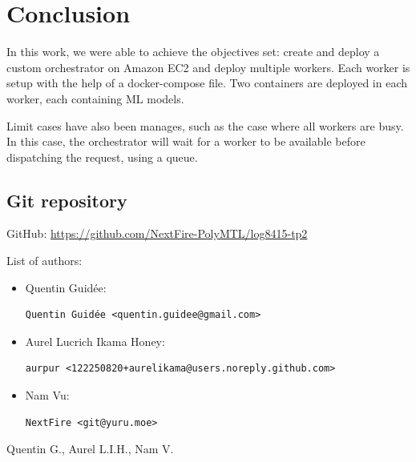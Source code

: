 \documentclass[letterpaper,headings=standardclasses,parskip=half]{scrartcl}
\newcommand{\todo}{{\color{red}{TODO}}}
\begin{document}
\todo

\section{Conclusion}

In this work, we were able to achieve the objectives set: create and deploy a custom orchestrator on Amazon EC2 and deploy multiple workers. Each worker is setup with the help of a docker-compose file. Two containers are deployed in each worker, each containing ML models.

Limit cases have also been manages, such as the case where all workers are busy. In this case, the orchestrator will wait for a worker to be available before dispatching the request, using a queue.


\subsection*{Git repository}

GitHub: \url{https://github.com/NextFire-PolyMTL/log8415-tp2}

List of authors:

\begin{itemize}
    \item Quentin Guidée:
          \begin{lstlisting}
Quentin Guidée <quentin.guidee@gmail.com>
\end{lstlisting}
    \item Aurel Lucrich Ikama Honey:
          \begin{lstlisting}
aurpur <122250820+aurelikama@users.noreply.github.com>
\end{lstlisting}
    \item Nam Vu:
          \begin{lstlisting}
NextFire <git@yuru.moe>
\end{lstlisting}
\end{itemize}


Quentin G., Aurel L.I.H., Nam V.

\end{document}
